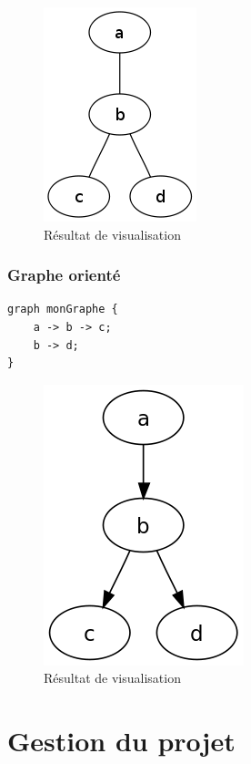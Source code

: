 \documentclass[12pt,a4paper]{report}
\begin{document}
\begin{figure}[!h]
  \centering
  \includegraphics[scale=0.3]{ressources/grapheNO.png}
  \caption{Résultat de visualisation}
\end{figure}

\subsection{Graphe orienté}

\begin{lstlisting}[caption=Description textuelle en DOT]
graph monGraphe {
    a -> b -> c;
    b -> d;
}
\end{lstlisting}

\begin{figure}[!h]
  \centering
  \includegraphics[scale=0.3]{ressources/grapheO.png}
  \caption{Résultat de visualisation}
\end{figure}

\chapter{Gestion du projet}
\end{document}
